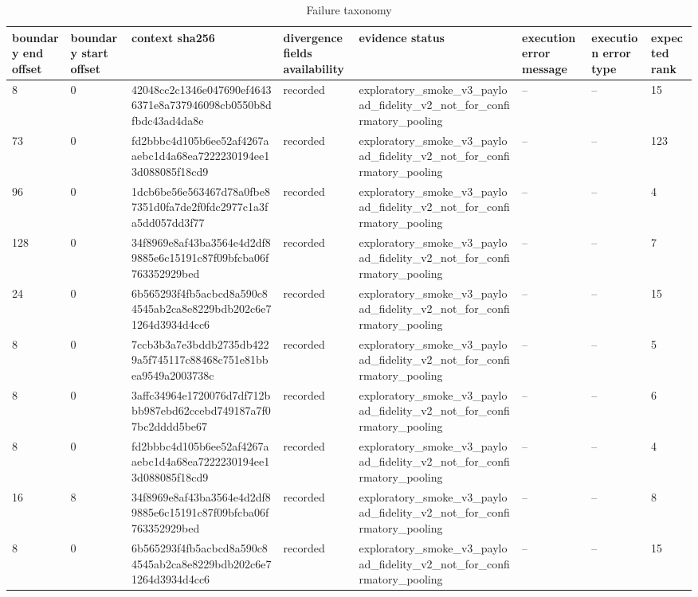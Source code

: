 \begin{table}[htbp]
\centering
\caption{Failure taxonomy}
\label{tab:s13}
\begin{tabular}{llllllll}
\hline
boundary end offset & boundary start offset & context sha256 & divergence fields availability & evidence status & execution error message & execution error type & expected rank \\
\hline
8 & 0 & 42048cc2c1346e047690ef46436371e8a737946098cb0550b8dfbdc43ad4da8e & recorded & exploratory\_smoke\_v3\_payload\_fidelity\_v2\_not\_for\_confirmatory\_pooling & -- & -- & 15 \\
73 & 0 & fd2bbbc4d105b6ee52af4267aaebc1d4a68ea7222230194ee13d088085f18cd9 & recorded & exploratory\_smoke\_v3\_payload\_fidelity\_v2\_not\_for\_confirmatory\_pooling & -- & -- & 123 \\
96 & 0 & 1dcb6be56e563467d78a0fbe87351d0fa7de2f0fdc2977c1a3fa5dd057dd3f77 & recorded & exploratory\_smoke\_v3\_payload\_fidelity\_v2\_not\_for\_confirmatory\_pooling & -- & -- & 4 \\
128 & 0 & 34f8969e8af43ba3564e4d2df89885e6c15191c87f09bfcba06f763352929bed & recorded & exploratory\_smoke\_v3\_payload\_fidelity\_v2\_not\_for\_confirmatory\_pooling & -- & -- & 7 \\
24 & 0 & 6b565293f4fb5acbcd8a590c84545ab2ca8e8229bdb202c6e71264d3934d4cc6 & recorded & exploratory\_smoke\_v3\_payload\_fidelity\_v2\_not\_for\_confirmatory\_pooling & -- & -- & 15 \\
8 & 0 & 7ccb3b3a7e3bddb2735db4229a5f745117c88468c751e81bbea9549a2003738c & recorded & exploratory\_smoke\_v3\_payload\_fidelity\_v2\_not\_for\_confirmatory\_pooling & -- & -- & 5 \\
8 & 0 & 3affc34964e1720076d7df712bbb987ebd62ccebd749187a7f07bc2dddd5be67 & recorded & exploratory\_smoke\_v3\_payload\_fidelity\_v2\_not\_for\_confirmatory\_pooling & -- & -- & 6 \\
8 & 0 & fd2bbbc4d105b6ee52af4267aaebc1d4a68ea7222230194ee13d088085f18cd9 & recorded & exploratory\_smoke\_v3\_payload\_fidelity\_v2\_not\_for\_confirmatory\_pooling & -- & -- & 4 \\
16 & 8 & 34f8969e8af43ba3564e4d2df89885e6c15191c87f09bfcba06f763352929bed & recorded & exploratory\_smoke\_v3\_payload\_fidelity\_v2\_not\_for\_confirmatory\_pooling & -- & -- & 8 \\
8 & 0 & 6b565293f4fb5acbcd8a590c84545ab2ca8e8229bdb202c6e71264d3934d4cc6 & recorded & exploratory\_smoke\_v3\_payload\_fidelity\_v2\_not\_for\_confirmatory\_pooling & -- & -- & 15 \\

\end{tabular}
\end{table}
